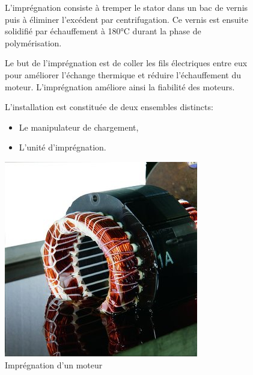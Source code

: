 \begin{figure}[htbp]
\begin{minipage}[c]{.65\linewidth}
L'imprégnation consiste à tremper le stator dans un bac de vernis puis à éliminer l'excédent par centrifugation. Ce vernis est ensuite solidifié par échauffement à 180°C durant la phase de polymérisation.

Le but de l'imprégnation est de coller les fils électriques entre eux pour améliorer l'échange thermique et réduire l'échauffement du moteur. L'imprégnation améliore ainsi la fiabilité des moteurs.

L'installation est constituée de deux ensembles distincts:
\begin{itemize}
 \item Le manipulateur de chargement,
 \item L'unité d'imprégnation.
\end{itemize}
\end{minipage}
\hfill
\begin{minipage}[c]{.30\linewidth}
\begin{center}
\includegraphics[width=\linewidth]{img/impregnation.jpg}
\caption{Imprégnation d'un moteur}
\label{fig:impre0}
\end{center}
\end{minipage}
\end{figure}

